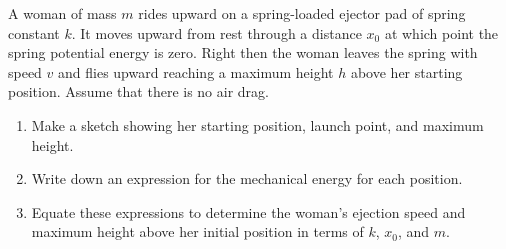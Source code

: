 \begin{exercise} 
  A woman of mass $m$ rides upward on a spring-loaded ejector pad of
  spring constant $k$.  It moves upward from rest through a distance
  $x_0$ at which point the spring potential energy is zero.  Right
  then the woman leaves the spring with speed $v$ and flies upward
  reaching a maximum height $h$ above her starting position.
  Assume that there is no air drag.
  \begin{enumerate}
  \item Make a sketch showing her starting position, launch point, and
    maximum height.

  \item Write down an expression for the mechanical energy for each position.

  \item Equate these expressions to determine the woman's ejection
    speed and maximum height above her initial position in terms of
    $k$, $x_0$, and $m$.
  \end{enumerate}
  \label{prob:spring_forward}
\end{exercise}


